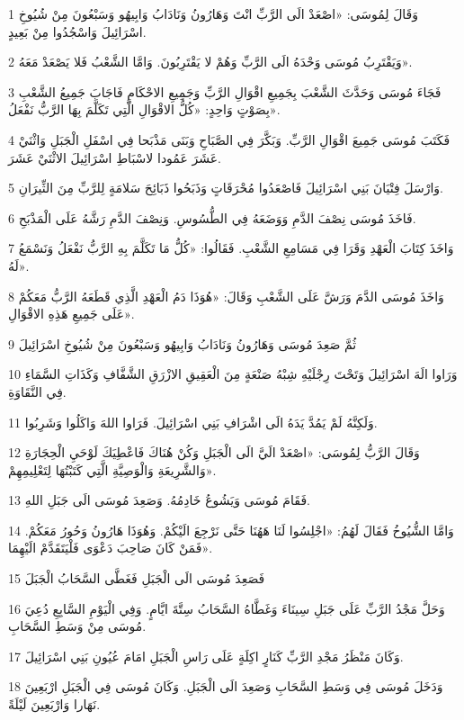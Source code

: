 \par 1 وَقَالَ لِمُوسَى: «اصْعَدْ الَى الرَّبِّ انْتَ وَهَارُونُ وَنَادَابُ وَابِيهُو وَسَبْعُونَ مِنْ شُيُوخِ اسْرَائِيلَ وَاسْجُدُوا مِنْ بَعِيدٍ.
\par 2 وَيَقْتَرِبُ مُوسَى وَحْدَهُ الَى الرَّبِّ وَهُمْ لا يَقْتَرِبُونَ. وَامَّا الشَّعْبُ فَلا يَصْعَدْ مَعَهُ».
\par 3 فَجَاءَ مُوسَى وَحَدَّثَ الشَّعْبَ بِجَمِيعِ اقْوَالِ الرَّبِّ وَجَمِيعِ الاحْكَامِ فَاجَابَ جَمِيعُ الشَّعْبِ بِصَوْتٍ وَاحِدٍ: «كُلُّ الاقْوَالِ الَّتِي تَكَلَّمَ بِهَا الرَّبُّ نَفْعَلُ».
\par 4 فَكَتَبَ مُوسَى جَمِيعَ اقْوَالِ الرَّبِّ. وَبَكَّرَ فِي الصَّبَاحِ وَبَنَى مَذْبَحا فِي اسْفَلِ الْجَبَلِ وَاثْنَيْ عَشَرَ عَمُودا لاسْبَاطِ اسْرَائِيلَ الاثْنَيْ عَشَرَ.
\par 5 وَارْسَلَ فِتْيَانَ بَنِي اسْرَائِيلَ فَاصْعَدُوا مُحْرَقَاتٍ وَذَبَحُوا ذَبَائِحَ سَلامَةٍ لِلرَّبِّ مِنَ الثِّيرَانِ.
\par 6 فَاخَذَ مُوسَى نِصْفَ الدَّمِ وَوَضَعَهُ فِي الطُّسُوسِ. وَنِصْفَ الدَّمِ رَشَّهُ عَلَى الْمَذْبَحِ.
\par 7 وَاخَذَ كِتَابَ الْعَهْدِ وَقَرَا فِي مَسَامِعِ الشَّعْبِ. فَقَالُوا: «كُلُّ مَا تَكَلَّمَ بِهِ الرَّبُّ نَفْعَلُ وَنَسْمَعُ لَهُ».
\par 8 وَاخَذَ مُوسَى الدَّمَ وَرَشَّ عَلَى الشَّعْبِ وَقَالَ: «هُوَذَا دَمُ الْعَهْدِ الَّذِي قَطَعَهُ الرَّبُّ مَعَكُمْ عَلَى جَمِيعِ هَذِهِ الاقْوَالِ».
\par 9 ثُمَّ صَعِدَ مُوسَى وَهَارُونُ وَنَادَابُ وَابِيهُو وَسَبْعُونَ مِنْ شُيُوخِ اسْرَائِيلَ
\par 10 وَرَاوا الَهَ اسْرَائِيلَ وَتَحْتَ رِجْلَيْهِ شِبْهُ صَنْعَةٍ مِنَ الْعَقِيقِ الازْرَقِ الشَّفَّافِ وَكَذَاتِ السَّمَاءِ فِي النَّقَاوَةِ.
\par 11 وَلَكِنَّهُ لَمْ يَمُدَّ يَدَهُ الَى اشْرَافِ بَنِي اسْرَائِيلَ. فَرَاوا اللهَ وَاكَلُوا وَشَرِبُوا.
\par 12 وَقَالَ الرَّبُّ لِمُوسَى: «اصْعَدْ الَيَّ الَى الْجَبَلِ وَكُنْ هُنَاكَ فَاعْطِيَكَ لَوْحَيِ الْحِجَارَةِ وَالشَّرِيعَةِ وَالْوَصِيَّةِ الَّتِي كَتَبْتُهَا لِتَعْلِيمِهِمْ».
\par 13 فَقَامَ مُوسَى وَيَشُوعُ خَادِمُهُ. وَصَعِدَ مُوسَى الَى جَبَلِ اللهِ.
\par 14 وَامَّا الشُّيُوخُ فَقَالَ لَهُمُ: «اجْلِسُوا لَنَا هَهُنَا حَتَّى نَرْجِعَ الَيْكُمْ. وَهُوَذَا هَارُونُ وَحُورُ مَعَكُمْ. فَمَنْ كَانَ صَاحِبَ دَعْوَى فَلْيَتَقَدَّمْ الَيْهِمَا».
\par 15 فَصَعِدَ مُوسَى الَى الْجَبَلِ فَغَطَّى السَّحَابُ الْجَبَلَ
\par 16 وَحَلَّ مَجْدُ الرَّبِّ عَلَى جَبَلِ سِينَاءَ وَغَطَّاهُ السَّحَابُ سِتَّةَ ايَّامٍ. وَفِي الْيَوْمِ السَّابِعِ دُعِيَ مُوسَى مِنْ وَسَطِ السَّحَابِ.
\par 17 وَكَانَ مَنْظَرُ مَجْدِ الرَّبِّ كَنَارٍ اكِلَةٍ عَلَى رَاسِ الْجَبَلِ امَامَ عُيُونِ بَنِي اسْرَائِيلَ.
\par 18 وَدَخَلَ مُوسَى فِي وَسَطِ السَّحَابِ وَصَعِدَ الَى الْجَبَلِ. وَكَانَ مُوسَى فِي الْجَبَلِ ارْبَعِينَ نَهَارا وَارْبَعِينَ لَيْلَةً.

